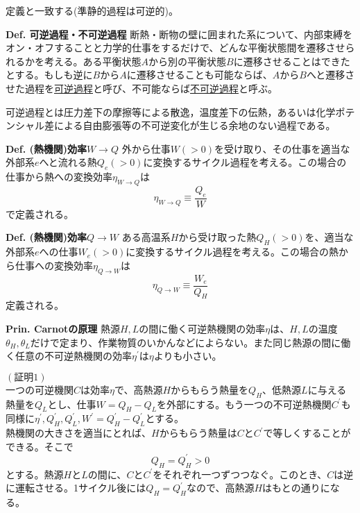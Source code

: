 \documentclass{jsarticle}
\begin{document}
定義と一致する(準静的過程は可逆的)。\\
\begin{itembox}[l]{\textbf{Def. 可逆過程・不可逆過程}}
断熱・断物の壁に囲まれた系について、内部束縛をオン・オフすることと力学的仕事をするだけで、どんな平衡状態間を遷移させられるかを考える。ある平衡状態\(A\)から別の平衡状態\(B\)に遷移させることはできたとする。もしも逆に\(B\)から\(A\)に遷移させることも可能ならば、\(A\)から\(B\)へと遷移させた過程を\underline{可逆過程}と呼び、不可能ならば\underline{不可逆過程}と呼ぶ。
\end{itembox}
可逆過程とは圧力差下の摩擦等による散逸，温度差下の伝熱，あるいは化学ポテンシャル差による自由膨張等の不可逆変化が生じる余地のない過程である。\\

\begin{itembox}[l]{\textbf{Def. (熱機関)効率\(W\to Q\)}}
外から仕事\(W(>0)\)を受け取り、その仕事を適当な外部系\(e\)へと流れる熱\(Q_{e}(>0)\)に変換するサイクル過程を考える。この場合の仕事から熱への変換効率\(\eta_{W\to Q}\)は
\[\eta_{W\to Q}\equiv \frac{Q_{e}}{W}\]
で定義される。
\end{itembox}
\begin{itembox}[l]{\textbf{Def. (熱機関)効率\(Q\to W\)}}
ある高温系\(H\)から受け取った熱\(Q_{H}(>0)\)を、適当な外部系\(e\)への仕事\(W_{e}(>0)\)に変換するサイクル過程を考える。この場合の熱から仕事への変換効率\(\eta_{Q\to W}\)は
\[\eta_{Q\to W}\equiv\frac{W_{e}}{Q_{H}}\]
定義される。
\end{itembox}
\hypertarget{Carnotの原理}{}
\begin{itembox}[l]{\textbf{Prin. Carnotの原理}}
熱源\(H,L\)の間に働く可逆熱機関の効率\(\eta\)は、\(H,L\)の温度\(\theta_{H},\theta_{L}\)だけで定まり、作業物質のいかんなどによらない。また同じ熱源の間に働く任意の不可逆熱機関の効率\(\eta^{\prime}\)は\(\eta\)よりも小さい。
\end{itembox}
\((証明1)\)\\
一つの可逆機関\(C\)は効率\(\eta\)で、高熱源\(H\)からもらう熱量を\(Q_{H}\)、低熱源\(L\)に与える熱量を\(Q_{L}\)とし、仕事\(W=Q_{H}-Q_{L}\)を外部にする。もう一つの不可逆熱機関\(C^{\prime}\)も同様に\(\eta^{\prime},Q_{H}^{\prime},Q_{L}^{\prime},W^{\prime}=Q_{H}^{\prime}-Q_{L}^{\prime}\)とする。\\
熱機関の大きさを適当にとれば、\(H\)からもらう熱量は\(C\)と\(C^{\prime}\)で等しくすることができる。そこで
\[Q_{H}=Q_{H}^{\prime}>0\]
とする。熱源\(H\)と\(L\)の間に、\(C\)と\(C^{\prime}\)をそれぞれ一つずつつなぐ。このとき、\(C\)は逆に運転させる。1サイクル後には\(Q_{H}=Q_{H}^{\prime}\)なので、高熱源\(H\)はもとの通りになる。\\
\end{document}
